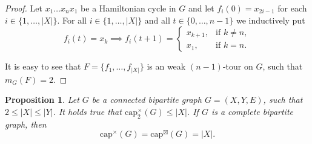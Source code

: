 \documentclass{article}
\newtheorem{proposition}[theorem]{Proposition}
\newcommand{\dcap}[2]{\mathrm{cap}^{\times}_{#1}(#2)}
\newcommand{\scap}[2]{\mathrm{cap}^{\boxtimes}_{#1}(#2)}
\begin{document}
\begin{proof}
Let $x_1 \ldots x_n x_1$ be a Hamiltonian cycle in $G$ and let $f_i(0)=x_{2i-1}$ for each $i\in \{1,\ldots,|X|\}$. For all $i\in \{1,\ldots,|X|\}$ and all $t \in \{0,\ldots,n-1\}$ we inductively put $$f_i(t)=x_k \implies f_i(t+1)=
\begin{cases}
    x_{k+1},  & \mbox{if } k \neq n, \\
		x_1,  & \mbox{if } k=n.
\end{cases}
$$ 

It is easy to see that $F=\{f_1,\ldots,f_{|X|}\}$ is an weak $(n-1)$-tour on $G$, such that $m_G(F) =2$. 
\end{proof}

\begin{proposition}\label{prop:bipartite-direct-2}
   Let $G$ be a connected bipartite graph $G=(X,Y,E)$, such that $2\leq |X| \leq |Y|$. It holds true that $\dcap{2}{G}\leq|X|$. If $G$ is a complete bipartite graph, then $$\dcap{}{G}=\scap{}{G}=|X|.$$
\end{proposition}
\end{document}
